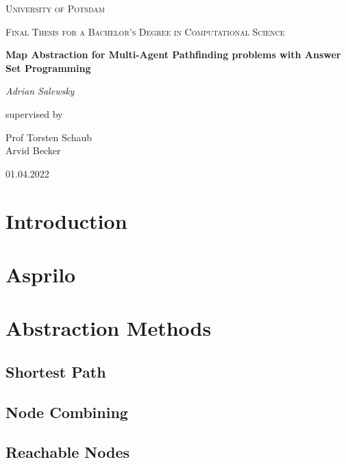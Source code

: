 \documentclass[runningheads]{llncs}
\begin{document}
\begin{titlepage}
\centering
{\scshape\LARGE University of Potsdam \par}
\vspace{1cm}
{\scshape\Large Final Thesis for a Bachelor's Degree in Computational Science\par}
\vspace{1.5cm}
{\huge\bfseries Map Abstraction for Multi-Agent Pathfinding problems with Answer Set Programming\par}
\vspace{2cm}
{\Large\itshape Adrian Salewsky\par}
\vfill
supervised by\par 
\vspace{\baselineskip}
Prof Torsten Schaub \\
\vspace{\baselineskip}
Arvid Becker
\vfill
{01.04.2022 \par}


\begin{abstract}
\end{abstract}
\end{titlepage}


\section{Introduction}

\section{Asprilo}

\section{Abstraction Methods}
\subsection{Shortest Path}
\subsection{Node Combining}
\subsection{Reachable Nodes}
\end{document}
